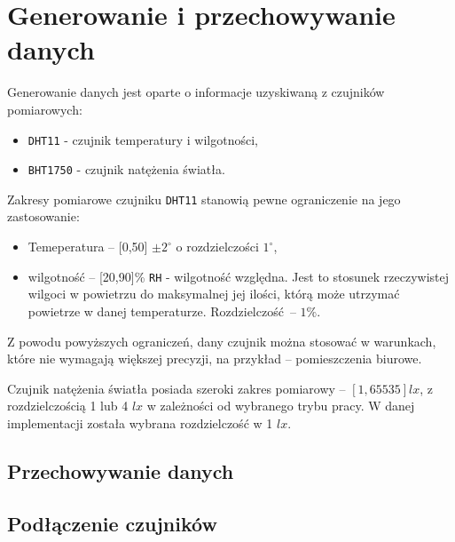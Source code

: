 \section{Generowanie i przechowywanie danych}
Generowanie danych jest oparte o informacje uzyskiwaną z 
czujników pomiarowych:
\begin{itemize}
  \item \texttt{DHT11} - czujnik temperatury i wilgotności,
  \item \texttt{BHT1750} - czujnik natężenia światła.
\end{itemize}
Zakresy pomiarowe czujniku \texttt{DHT11} stanowią pewne ograniczenie
na jego zastosowanie:
\begin{itemize}
  \item Temeperatura -- [0,50] $\pm 2^\circ$ o rozdzielczości $1^\circ$,
  \item wilgotność -- [20,90]\% \texttt{RH} - wilgotność względna. 
    Jest to stosunek rzeczywistej wilgoci w powietrzu do maksymalnej jej ilości, 
    którą może utrzymać powietrze w danej temperaturze.
    Rozdzielczość -- $1\%$.
\end{itemize}
Z powodu powyższych ograniczeń, dany czujnik można stosować w warunkach, które
nie wymagają większej precyzji, na przykład -- pomieszczenia biurowe.

Czujnik natężenia światła posiada szeroki zakres pomiarowy -- $[1,65535] lx$,
z rozdzielczością 1 lub 4 $lx$ w zależności od wybranego trybu pracy. 
W danej implementacji została wybrana rozdzielczość w 1 $lx$.

\subsection{Przechowywanie danych}
\subsection{Podłączenie czujników}
